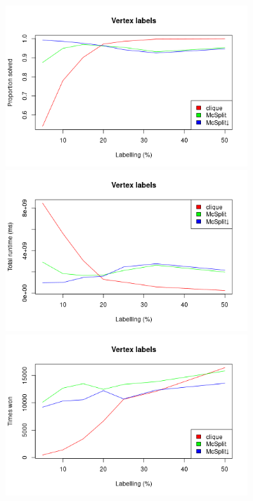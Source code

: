 \documentclass{l4proj}
\theoremstyle{definition}
\theoremstyle{remark}
\begin{document}
\begin{figure}
  \centering
  \begin{subfigure}[t]{0.49\textwidth}
    \centering
    \includegraphics[width=\textwidth]{images/vertex_labels_linechart.png}
    \includegraphics[width=\textwidth]{images/vertex_labels_linechart2.png}
    \includegraphics[width=\textwidth]{images/vertex_labels_linechart3.png}

\end{subfigure}
\end{figure}
\end{document}

